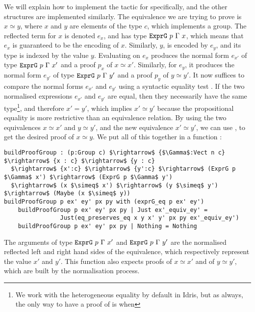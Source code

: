 We will explain how to implement the tactic for  specifically,
and the other structures are implemented similarly.
The equivalence we are trying to prove is $x \simeq y$, where $x$ and $y$ are
elements of the type $c$, which implements a group. The reflected term for $x$
is denoted $e_x$, and has type ${\mbox{\texttt{ExprG}}}\ p\
\Gamma\ x$, which means that $e_x$ is guaranteed to be the encoding of $x$.  
Similarly,
$y$, is encoded by $e_y$, and its type is indexed by the
value $y$.  Evaluating  on $e_x$ produces the
normal form $e_{x'}$ of type $\code{ExprG}\ p\ \Gamma\ x'$ and a proof $p_x$ of
$x \simeq x'$.
Similarly, for $e_y$, it produces
the normal form $e_{y'}$ of type $\code{ExprG}\ p\ \Gamma\ y'$ and a proof
$p_y$ of $y \simeq y'$.  It now suffices to compare the normal forms $e_{x'}$ and $e_{y'}$
using a syntactic equality test \code{exprG\_eq}. If the two normalised expressions $e_{x'}$ and $e_{y'}$ are equal, then
they necessarily have the same type\footnote{We work with the
heterogeneous equality by default in Idris, but as always, the only way to
have a proof of \code{a:A = b:B} is when \code{A = B}}, and therefore $x'=y'$, which implies
$x' \simeq y'$ because the propositional equality is more restrictive than an
equivalence relation.  By using the two equivalences $x \simeq x'$ and $y
\simeq y'$, and the new equivalence
$x' \simeq y'$, we can use , to get the desired proof of
$x \simeq y$. We put all of this together in a function
:

\begin{lstlisting}
buildProofGroup : (p:Group c) $\rightarrow$ {$\Gamma$:Vect n c} $\rightarrow$ {x : c} $\rightarrow$ {y : c} 
  $\rightarrow$ {x':c} $\rightarrow$ {y':c} $\rightarrow$ (ExprG p $\Gamma$ x') $\rightarrow$ (ExprG p $\Gamma$ y') 
  $\rightarrow$ (x $\simeq$ x') $\rightarrow$ (y $\simeq$ y') $\rightarrow$ (Maybe (x $\simeq$ y))
buildProofGroup p ex' ey' px py with (exprG_eq p ex' ey')
    buildProofGroup p ex' ey' px py | Just ex'_equiv_ey' = 
                Just(eq_preserves_eq x y x' y' px py ex'_equiv_ey')
    buildProofGroup p ex' ey' px py | Nothing = Nothing
\end{lstlisting}

The arguments of type $\code{ExprG}\ p\ \Gamma\ x'$ and $\code{ExprG}\ p\ \Gamma\ y'$ are the normalised reflected
left and right hand sides of the equivalence, which respectively represent the value $x'$ and $y'$. 
This function also expects proofs of $x \simeq x'$ and
of $y \simeq y'$, which are built by the normalisation process.

